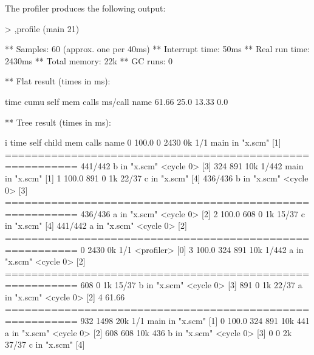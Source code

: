 The profiler produces the following output:

\begin{example}
> ,profile (main 21)

** Samples:        60 (approx. one per 40ms)
** Interrupt time: 50ms
** Real run time:  2430ms
** Total memory:   22k
** GC runs:        0

** Flat result (times in ms): 

   time  cumu  self   mem  calls  ms/call  name
 61.66%
  25.0%
 13.33%
   0.0%

** Tree result (times in ms): 

i    time self child  mem    calls  name
0  100.0%
             0  2430   0k      1/1     main in "x.scm" [1]
=========================================================
                           441/442     b in "x.scm" <cycle 0> [3]
           324   891  10k    1/442     main in "x.scm" [1]
1  100.0%
           891     0   1k    22/37     c in "x.scm" [4]
                           436/436     b in "x.scm" <cycle 0> [3]
=========================================================
                           436/436     a in "x.scm" <cycle 0> [2]
2  100.0%
           608     0   1k    15/37     c in "x.scm" [4]
                           441/442     a in "x.scm" <cycle 0> [2]
=========================================================
             0  2430   0k      1/1     <profiler> [0]
3  100.0%
           324   891  10k    1/442     a in "x.scm" <cycle 0> [2]
=========================================================
           608     0   1k    15/37     b in "x.scm" <cycle 0> [3]
           891     0   1k    22/37     a in "x.scm" <cycle 0> [2]
4  61.66%
=========================================================
           932  1498  20k      1/1     main in "x.scm" [1]
0  100.0%
           324   891  10k      441     a in "x.scm" <cycle 0> [2]
           608   608  10k      436     b in "x.scm" <cycle 0> [3]
             0     0   2k    37/37     c in "x.scm" [4]

\end{example}


